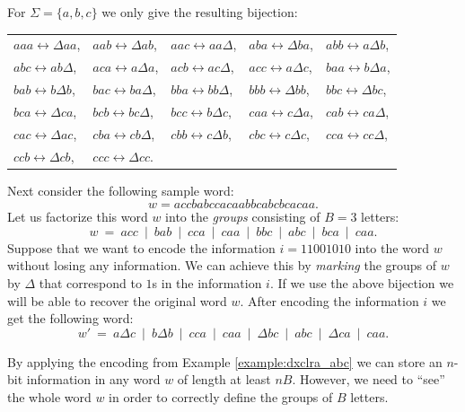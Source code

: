 \begin{example}\label{example:dxclra_abc}
For $\Sigma = \{a, b, c\}$ we only give the resulting bijection:
\begin{center}
\begin{tabular}{lllll}
  $aaa \leftrightarrow \Delta a a$,\quad\quad
& $aab \leftrightarrow \Delta a b$,\quad\quad
& $aac \leftrightarrow a a \Delta$,\quad\quad
& $aba \leftrightarrow \Delta b a$,\quad\quad
& $abb \leftrightarrow a \Delta b$,\\
  $abc \leftrightarrow a b \Delta$,
& $aca \leftrightarrow a \Delta a$,
& $acb \leftrightarrow a c \Delta$,
& $acc \leftrightarrow a \Delta c$,
& $baa \leftrightarrow b \Delta a$,\\
  $bab \leftrightarrow b \Delta b$,
& $bac \leftrightarrow b a \Delta$,
& $bba \leftrightarrow b b \Delta$,
& $bbb \leftrightarrow \Delta b b$,
& $bbc \leftrightarrow \Delta b c$,\\
  $bca \leftrightarrow \Delta c a$,
& $bcb \leftrightarrow b c \Delta$,
& $bcc \leftrightarrow b \Delta c$,
& $caa \leftrightarrow c \Delta a$,
& $cab \leftrightarrow c a \Delta$,\\
  $cac \leftrightarrow \Delta a c$,
& $cba \leftrightarrow c b \Delta$,
& $cbb \leftrightarrow c \Delta b$,
& $cbc \leftrightarrow c \Delta c$,
& $cca \leftrightarrow c c \Delta$,\\
  $ccb \leftrightarrow \Delta c b$,
& $ccc \leftrightarrow \Delta c c$.
\end{tabular}
\end{center}

Next consider the following sample word:
$$w = acc bab cca caa bbc abc bca caa.$$
Let us factorize this word $w$ into the \emph{groups} consisting of $B = 3$ letters:
$$w\ =\ acc\ \mid\ bab\ \mid\ cca\ \mid\ caa\ \mid\ bbc\ \mid\ abc\ \mid\ bca\ \mid\ caa.$$
Suppose that we want to encode the information $i = 11001010$ into the word $w$ without losing any information. We can achieve this by \emph{marking} the groups of $w$ by $\Delta$ that correspond to $1$s in the information $i$. If we use the above bijection we will be able to recover the original word $w$. After encoding the information $i$ we get the following word:
$$w'\ =\ a \Delta c\ \mid\ b \Delta b\ \mid\ c c a\ \mid\ c a a\ \mid
       \ \Delta b c\ \mid\ a b c\ \mid\ \Delta c a\ \mid\ c a a.$$
\end{example}

By applying the encoding from Example \ref{example:dxclra_abc} we can store an $n$-bit information in any word $w$ of length at least $n B$. However, we need to ``see'' the whole word $w$ in order to correctly define the groups of $B$ letters.

